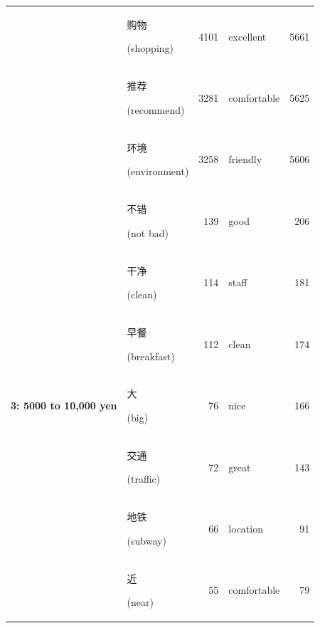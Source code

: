 \documentclass[smallextended,natbib]{svjour3}       %
\begin{document}
\begin{table}[ht]
{\begin{tabular}{|c|lr|lr|}
                                                             & \begin{CJK}{UTF8}{gbsn}购物\end{CJK} (shopping)        & 4101  & excellent   & 5661  \\  
                                                             & \begin{CJK}{UTF8}{gbsn}推荐\end{CJK} (recommend)       & 3281  & comfortable & 5625  \\  
                                                             & \begin{CJK}{UTF8}{gbsn}环境\end{CJK} (environment)    & 3258  & friendly    & 5606  \\ \hline
        \multirow{10}{*}{\textbf{3: 5000 to 10,000 yen}}     & \begin{CJK}{UTF8}{gbsn}不错\end{CJK} (not bad)         & 139   & good        & 206   \\  
                                                             & \begin{CJK}{UTF8}{gbsn}干净\end{CJK} (clean)           & 114   & staff       & 181   \\  
                                                             & \begin{CJK}{UTF8}{gbsn}早餐\end{CJK} (breakfast)       & 112   & clean       & 174   \\  
                                                             & \begin{CJK}{UTF8}{gbsn}大\end{CJK} (big)              & 76    & nice        & 166   \\  
                                                             & \begin{CJK}{UTF8}{gbsn}交通\end{CJK} (traffic)         & 72    & great       & 143   \\  
                                                             & \begin{CJK}{UTF8}{gbsn}地铁\end{CJK} (subway)          & 66    & location    & 91    \\  
                                                             & \begin{CJK}{UTF8}{gbsn}近\end{CJK} (near)             & 55    & comfortable & 79    \\  

\end{tabular}}
\end{table}
\end{document}
